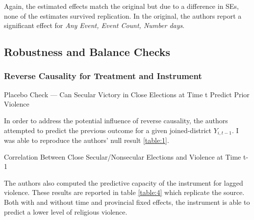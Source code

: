 \documentclass{scrartcl}
\begin{document}
Again, the estimated effects match the original but due to a difference in SEs, none of the estimates survived replication. In the original, the authors report a significant effect for \textit{Any Event, Event Count, Number days}.

\subsection{Robustness and Balance Checks}

\subsubsection{Reverse Causality for Treatment and Instrument}

\begin{table}[ht]
  \begin{center}
    \scalebox{0.75}{
      
    }
    \caption{Placebo Check — Can Secular Victory in Close Elections at Time t Predict Prior Violence}
    \label{table:1}
  \end{center}
\end{table}

In order to address the potential influence of reverse causality, the authors attempted to predict the previous outcome for a given joined-district $Y_{i,t-1}$.
I was able to reproduce the authors' null result \ref{table:1}.

\begin{table}[ht]
  \begin{center}
    \scalebox{0.75}{
      
    }
    \caption{Correlation Between Close Secular/Nonsecular Elections and Violence at Time t-1}
    \label{table:4}
  \end{center}
\end{table}

The authors also computed the predictive capacity of the instrument for lagged violence.
These results are reported in table \ref{table:4} which replicate the source.
Both with and without time and provincial fixed effects, the instrument is able to predict a lower level of religious violence.
\end{document}
